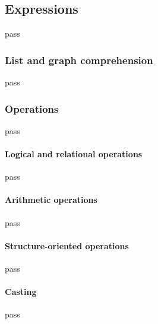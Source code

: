 \subsection{Expressions}
\label{sec:expressions}
pass

\subsubsection{List and graph comprehension}
\label{sec:comprehension}
pass

\subsubsection{Operations}
pass

\paragraph{Logical and relational operations}
pass

\paragraph{Arithmetic operations}
pass

\paragraph{Structure-oriented operations}
pass

\paragraph{Casting}
\label{sec:casting}
pass